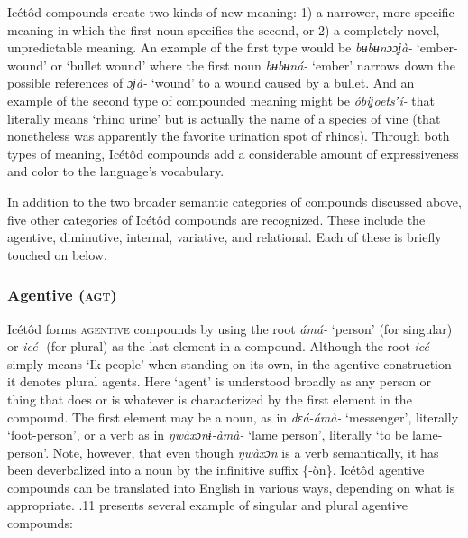 Icétôd compounds create two kinds of new meaning: 1) a narrower, more specific meaning in which the first noun specifies the second, or 2) a completely novel, unpredictable meaning. An example of the first type would be \textit{bʉbʉnɔɔʝà-} ‘ember-wound’ or ‘bullet wound’ where the first noun \textit{bʉbʉná-} ‘ember’ narrows down the possible references of \textit{ɔʝá-} ‘wound’ to a wound caused by a bullet. And an example of the second type of compounded meaning might be \textit{óbiʝoetsʼí-} that literally means ‘rhino urine’ but is actually the name of a species of vine (that nonetheless was apparently the favorite urination spot of rhinos). Through both types of meaning, Icétôd compounds add a considerable amount of expressiveness and color to the language’s vocabulary.

In addition to the two broader semantic categories of compounds discussed above, five other categories of Icétôd compounds are recognized. These include the agentive, diminutive, internal, variative, and relational. Each of these is briefly touched on below.


\subsubsection{Agentive (\textsc{agt})}

Icétôd forms \textsc{agentive} compounds by using the root \textit{ámá-} ‘person’ (for singular) or \textit{icé-} (for plural) as the last element in a compound. Although the root \textit{icé-} simply means ‘Ik people’ when standing on its own, in the agentive construction it denotes plural agents. Here ‘agent’ is understood broadly as any person or thing that does or is whatever is characterized by the first element in the compound. The first element may be a noun, as in \textit{dɛá-ámà-} ‘messenger’, literally ‘foot-person’, or a verb as in \textit{ŋwàxɔnɨ-àmà-} ‘lame person’, literally ‘to be lame-person’. Note, however, that even though \textit{ŋwàxɔn} is a verb semantically, it has been deverbalized into a noun by the infinitive suffix \{-òn\}. Icétôd agentive compounds can be translated into English in various ways, depending on what is appropriate. .11 presents several example of singular and plural agentive compounds:


